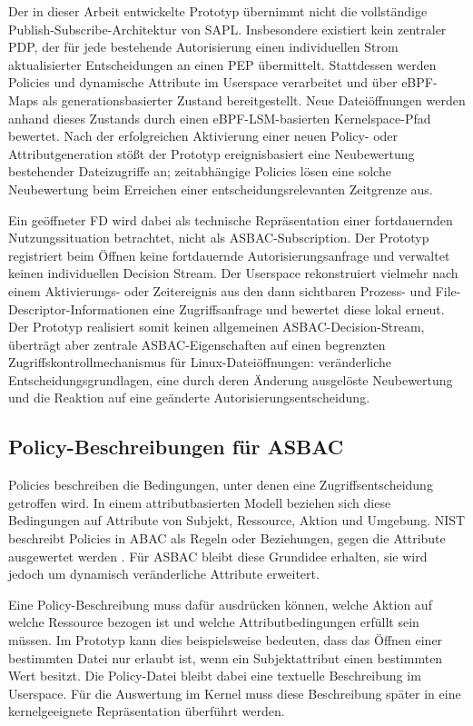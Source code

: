 Der in dieser Arbeit entwickelte Prototyp übernimmt nicht die vollständige Publish-Subscribe-Architektur von SAPL.
Insbesondere existiert kein zentraler PDP, der für jede bestehende Autorisierung einen individuellen Strom aktualisierter Entscheidungen an einen PEP übermittelt.
Stattdessen werden Policies und dynamische Attribute im Userspace verarbeitet und über eBPF-Maps als generationsbasierter Zustand bereitgestellt.
Neue Dateiöffnungen werden anhand dieses Zustands durch einen eBPF-LSM-basierten Kernelspace-Pfad bewertet.
Nach der erfolgreichen Aktivierung einer neuen Policy- oder Attributgeneration stößt der Prototyp ereignisbasiert eine Neubewertung bestehender Dateizugriffe an; zeitabhängige Policies lösen eine solche Neubewertung beim Erreichen einer entscheidungsrelevanten Zeitgrenze aus.

Ein geöffneter FD wird dabei als technische Repräsentation einer fortdauernden Nutzungssituation betrachtet, nicht als ASBAC-Subscription.
Der Prototyp registriert beim Öffnen keine fortdauernde Autorisierungsanfrage und verwaltet keinen individuellen Decision Stream.
Der Userspace rekonstruiert vielmehr nach einem Aktivierungs- oder Zeitereignis aus den dann sichtbaren Prozess- und File-Descriptor-Informationen eine Zugriffsanfrage und bewertet diese lokal erneut.
Der Prototyp realisiert somit keinen allgemeinen ASBAC-Decision-Stream, überträgt aber zentrale ASBAC-Eigenschaften auf einen begrenzten Zugriffskontrollmechanismus für Linux-Dateiöffnungen: veränderliche Entscheidungsgrundlagen, eine durch deren Änderung ausgelöste Neubewertung und die Reaktion auf eine geänderte Autorisierungsentscheidung.

\subsection{Policy-Beschreibungen für ASBAC}
Policies beschreiben die Bedingungen, unter denen eine Zugriffsentscheidung getroffen wird. 
In einem attributbasierten Modell beziehen sich diese Bedingungen auf Attribute von Subjekt, Ressource, Aktion und Umgebung. 
NIST beschreibt Policies in ABAC als Regeln oder Beziehungen, gegen die Attribute ausgewertet werden \citep{nistSP800162}. 
Für ASBAC bleibt diese Grundidee erhalten, sie wird jedoch um dynamisch veränderliche Attribute erweitert.

Eine Policy-Beschreibung muss dafür ausdrücken können, welche Aktion auf welche Ressource bezogen ist und welche Attributbedingungen erfüllt sein müssen. 
Im Prototyp kann dies beispielsweise bedeuten, dass das Öffnen einer bestimmten Datei nur erlaubt ist, wenn ein Subjektattribut einen bestimmten Wert besitzt. 
Die Policy-Datei bleibt dabei eine textuelle Beschreibung im Userspace. 
Für die Auswertung im Kernel muss diese Beschreibung später in eine kernelgeeignete Repräsentation überführt werden.

